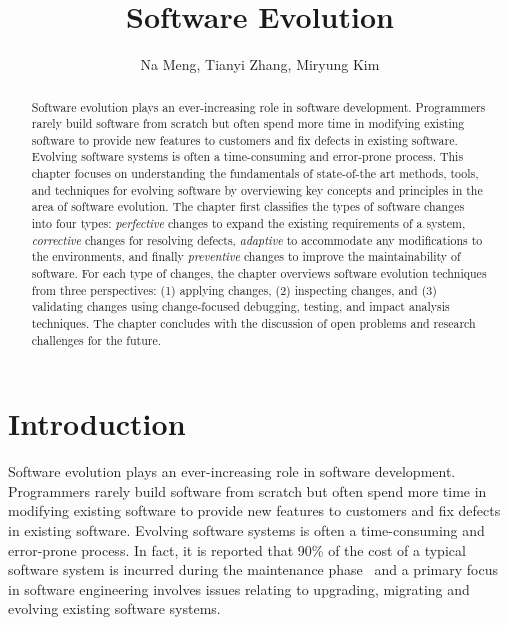 \documentclass[runningheads,a4paper]{llncs}
\begin{document}
\mainmatter  %

\title{Software Evolution} 


%
%
\author{Na Meng, Tianyi Zhang, Miryung Kim} 



\maketitle


\begin{abstract}
	Software evolution plays an ever-increasing role in software development. Programmers rarely build software from scratch but often spend more time in modifying existing software to provide new features to customers and fix defects in existing software. Evolving software systems is often a time-consuming and error-prone process. This chapter focuses on understanding the fundamentals of state-of-the art methods, tools, and techniques for evolving software by overviewing key concepts and principles in the area of software evolution. 
	The chapter first classifies the types of software changes into four types: {\em perfective} changes to expand the existing requirements of a system, {\em corrective} changes for resolving defects, {\em adaptive} to accommodate any modifications to the environments, and finally {\em preventive} changes to improve the maintainability of software. For each type of changes, the chapter overviews software evolution techniques from three perspectives: (1) applying changes, (2) inspecting changes, and (3) validating changes using change-focused debugging, testing, and impact analysis techniques. The chapter concludes with the discussion of open problems and research challenges for the future. 
\end{abstract}

\section{Introduction}
Software evolution plays an ever-increasing role in software development. Programmers rarely build software from scratch but often spend more time in modifying existing software to provide new features to customers and fix defects in existing software.  Evolving software systems is often a time-consuming and error-prone process. In fact, it is reported that 90\% of the cost of a typical software system is incurred during the maintenance phase~\cite{Madhavji2006} and a primary focus in software engineering involves issues relating to upgrading, migrating and evolving existing software systems. 
\end{document}
